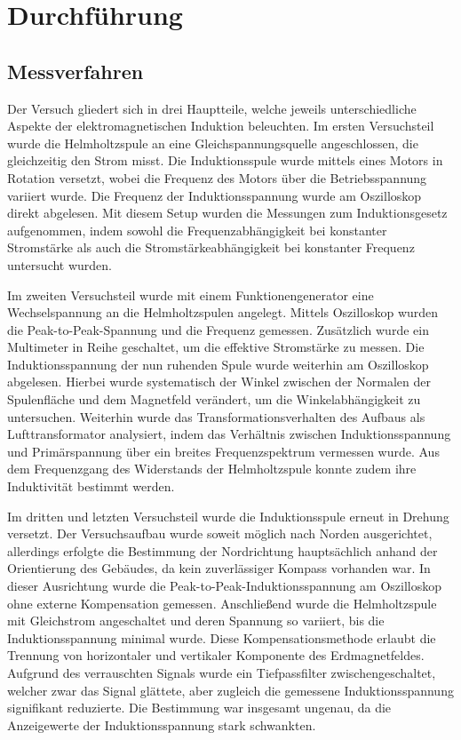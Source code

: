 \chapter{Durchführung} 
\label{ch:Durchfuehrung}

\section{Messverfahren}
\label{sec:Messverfahren}

Der Versuch gliedert sich in drei Hauptteile, welche jeweils unterschiedliche Aspekte der elektromagnetischen Induktion beleuchten. Im ersten Versuchsteil wurde die Helmholtzspule an eine Gleichspannungsquelle angeschlossen, die gleichzeitig den Strom misst. Die Induktionsspule wurde mittels eines Motors in Rotation versetzt, wobei die Frequenz des Motors über die Betriebsspannung variiert wurde. Die Frequenz der Induktionsspannung wurde am Oszilloskop direkt abgelesen. Mit diesem Setup wurden die Messungen zum Induktionsgesetz aufgenommen, indem sowohl die Frequenzabhängigkeit bei konstanter Stromstärke als auch die Stromstärkeabhängigkeit bei konstanter Frequenz untersucht wurden.

Im zweiten Versuchsteil wurde mit einem Funktionengenerator eine Wechselspannung an die Helmholtzspulen angelegt. Mittels Oszilloskop wurden die Peak-to-Peak-Spannung und die Frequenz gemessen. Zusätzlich wurde ein Multimeter in Reihe geschaltet, um die effektive Stromstärke zu messen. Die Induktionsspannung der nun ruhenden Spule wurde weiterhin am Oszilloskop abgelesen. Hierbei wurde systematisch der Winkel zwischen der Normalen der Spulenfläche und dem Magnetfeld verändert, um die Winkelabhängigkeit zu untersuchen. Weiterhin wurde das Transformationsverhalten des Aufbaus als Lufttransformator analysiert, indem das Verhältnis zwischen Induktionsspannung und Primärspannung über ein breites Frequenzspektrum vermessen wurde. Aus dem Frequenzgang des Widerstands der Helmholtzspule konnte zudem ihre Induktivität bestimmt werden.

Im dritten und letzten Versuchsteil wurde die Induktionsspule erneut in Drehung versetzt. Der Versuchsaufbau wurde soweit möglich nach Norden ausgerichtet, allerdings erfolgte die Bestimmung der Nordrichtung hauptsächlich anhand der Orientierung des Gebäudes, da kein zuverlässiger Kompass vorhanden war. In dieser Ausrichtung wurde die Peak-to-Peak-Induktionsspannung am Oszilloskop ohne externe Kompensation gemessen. Anschließend wurde die Helmholtzspule mit Gleichstrom angeschaltet und deren Spannung so variiert, bis die Induktionsspannung minimal wurde. Diese Kompensationsmethode erlaubt die Trennung von horizontaler und vertikaler Komponente des Erdmagnetfeldes. Aufgrund des verrauschten Signals wurde ein Tiefpassfilter zwischengeschaltet, welcher zwar das Signal glättete, aber zugleich die gemessene Induktionsspannung signifikant reduzierte. Die Bestimmung war insgesamt ungenau, da die Anzeigewerte der Induktionsspannung stark schwankten.

